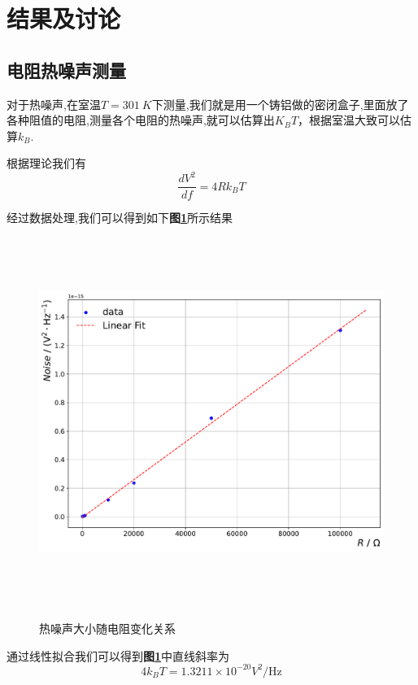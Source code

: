 \documentclass[a4paper]{article}
\begin{document}
\newpage
\section{结果及讨论}
\subsection{电阻热噪声测量}\label{sub:1}
对于热噪声,在室温\(T=\SI{301}{K}\)下测量,我们就是用一个铸铝做的密闭盒子,里面放了各种阻值的电阻,测量各个电阻的热噪声,就可以估算出$K_B T$，根据室温大致可以估算$k_B$.

根据理论我们有
\begin{equation}
    \frac{dV^2}{df}=4Rk_BT
\end{equation}

经过数据处理,我们可以得到如下\textbf{图\ref{fig:fig3}}所示结果 
\begin{figure}[H]
 \centering
 \caption{热噪声大小随电阻变化关系}
 \includegraphics[height=12cm, width=16cm]{images/phyex1_fig1.pdf}
 \label{fig:fig3}
\end{figure}

通过线性拟合我们可以得到\textbf{图\ref{fig:fig3}}中直线斜率为
\begin{equation}
    4k_B T=1.3211\times 10^{-20}\si{V^2/\hertz}
\end{equation}
\end{document}
